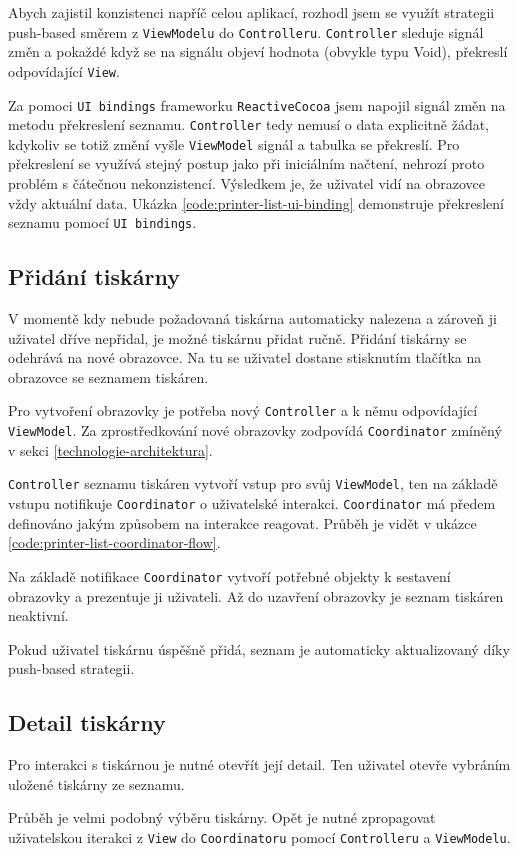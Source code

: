 \bigskip

Abych zajistil konzistenci napříč celou aplikací, rozhodl jsem se využít strategii push-based směrem z \texttt{ViewModelu} do \texttt{Controlleru}.
\texttt{Controller} sleduje signál změn a pokaždé když se na signálu objeví hodnota (obvykle typu Void), překreslí odpovídající \texttt{View}.

Za pomoci \texttt{UI bindings} frameworku \texttt{ReactiveCocoa} jsem napojil signál změn na metodu překreslení seznamu.
\texttt{Controller} tedy nemusí o data explicitně žádat, kdykoliv se totiž změní vyšle \texttt{ViewModel} signál a tabulka se překreslí.
Pro překreslení se využívá stejný postup jako při iniciálním načtení, nehrozí proto problém s čátečnou nekonzistencí.
Výsledkem je, že uživatel vidí na obrazovce vždy aktuální data.
Ukázka \ref{code:printer-list-ui-binding} demonstruje překreslení seznamu pomocí \texttt{UI bindings}.


\subsection{Přidání tiskárny}

V momentě kdy nebude požadovaná tiskárna automaticky nalezena a zároveň ji uživatel dříve nepřidal, je možné tiskárnu přidat ručně.
Přidání tiskárny se odehrává na nové obrazovce.
Na tu se uživatel dostane stisknutím tlačítka \uv{+} na obrazovce se seznamem tiskáren.

Pro vytvoření obrazovky je potřeba nový \texttt{Controller} a k němu odpovídající \texttt{ViewModel}.
Za zprostředkování nové obrazovky zodpovídá \texttt{Coordinator} zmíněný v sekci \ref{technologie-architektura}.

\texttt{Controller} seznamu tiskáren vytvoří vstup pro svůj \texttt{ViewModel}, ten na základě vstupu notifikuje \texttt{Coordinator} o uživatelské interakci.
\texttt{Coordinator} má předem definováno jakým způsobem na interakce reagovat.
Průběh je vidět v ukázce \ref{code:printer-list-coordinator-flow}.

Na základě notifikace \texttt{Coordinator} vytvoří potřebné objekty k sestavení obrazovky a prezentuje ji uživateli.
Až do uzavření obrazovky je seznam tiskáren neaktivní.

Pokud uživatel tiskárnu úspěšně přidá, seznam je automaticky aktualizovaný díky push-based strategii.


\subsection{Detail tiskárny}

Pro interakci s tiskárnou je nutné otevřít její detail.
Ten uživatel otevře vybráním uložené tiskárny ze seznamu.

Průběh je velmi podobný výběru tiskárny.
Opět je nutné zpropagovat uživatelskou iterakci z \texttt{View} do \texttt{Coordinatoru} pomocí \texttt{Controlleru} a \texttt{ViewModelu}.